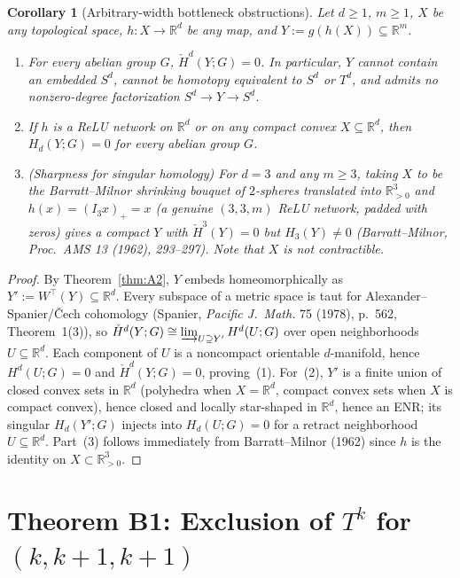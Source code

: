 \documentclass[11pt]{article}
\theoremstyle{plain}
\newtheorem{corollary}[theorem]{Corollary}
\theoremstyle{definition}
\theoremstyle{remark}
\begin{document}
\begin{corollary}[Arbitrary-width bottleneck obstructions]\label{cor:A2}
Let $d \ge 1$, $m \ge 1$, $X$ be any topological space, $h : X \to \mathbb{R}^d$ be any map, and $Y := g(h(X)) \subseteq \mathbb{R}^m$.
\begin{enumerate}[label=\textup{(\arabic*)}]
\item For every abelian group $G$, $\check{H}^d(Y; G) = 0$. In particular, $Y$ cannot contain an embedded $S^d$, cannot be homotopy equivalent to $S^d$ or $T^d$, and admits no nonzero-degree factorization $S^d \to Y \to S^d$.
\item If $h$ is a ReLU network on $\mathbb{R}^d$ or on any compact convex $X \subseteq \mathbb{R}^d$, then $H_d(Y; G) = 0$ for every abelian group $G$.
\item \emph{(Sharpness for singular homology)} For $d = 3$ and any $m \ge 3$, taking $X$ to be the Barratt--Milnor shrinking bouquet of $2$-spheres translated into $\mathbb{R}_{>0}^3$ and $h(x) = (I_3 x)_+ = x$ (a genuine $(3, 3, m)$ ReLU network, padded with zeros) gives a compact $Y$ with $\check{H}^3(Y) = 0$ but $H_3(Y) \neq 0$ (Barratt--Milnor, \emph{Proc.\ AMS} 13 (1962), 293--297). Note that $X$ is not contractible.
\end{enumerate}
\end{corollary}

\begin{proof}
By Theorem~\ref{thm:A2}, $Y$ embeds homeomorphically as $Y' := W^\top(Y) \subseteq \mathbb{R}^d$. Every subspace of a metric space is taut for Alexander--Spanier/\v{C}ech cohomology (Spanier, \emph{Pacific J.\ Math.} 75 (1978), p.~562, Theorem~1(3)), so $\check{H}^d(Y; G) \cong \varinjlim_{U \supseteq Y'} H^d(U; G)$ over open neighborhoods $U \subseteq \mathbb{R}^d$. Each component of $U$ is a noncompact orientable $d$-manifold, hence $H^d(U; G) = 0$ and $\check{H}^d(Y; G) = 0$, proving~(1). For~(2), $Y'$ is a finite union of closed convex sets in $\mathbb{R}^d$ (polyhedra when $X = \mathbb{R}^d$, compact convex sets when $X$ is compact convex), hence closed and locally star-shaped in $\mathbb{R}^d$, hence an ENR; its singular $H_d(Y'; G)$ injects into $H_d(U; G) = 0$ for a retract neighborhood $U \subseteq \mathbb{R}^d$. Part~(3) follows immediately from Barratt--Milnor (1962) since $h$ is the identity on $X \subset \mathbb{R}_{>0}^3$.
\end{proof}

\section{Theorem B1: Exclusion of \texorpdfstring{$T^k$}{Tk} for \texorpdfstring{$(k, k+1, k+1)$}{(k,k+1,k+1)}}\label{sec:B1}
\end{document}
